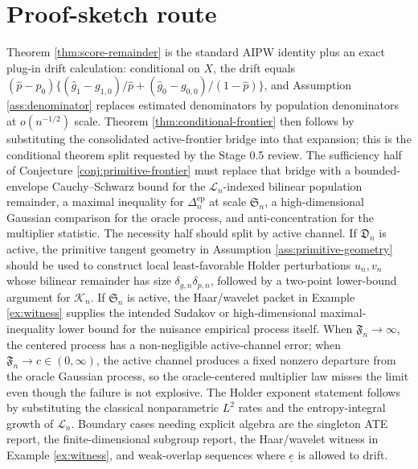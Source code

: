 \documentclass[11pt]{article}
\theoremstyle{definition}
\theoremstyle{plain}
\theoremstyle{remark}
\begin{document}
\section{Proof-sketch route}
Theorem \ref{thm:score-remainder} is the standard AIPW identity plus an exact
plug-in drift calculation: conditional on \(X\), the drift equals
\((\hat p-p_0)\{(\hat g_1-g_{1,0})/\hat p+(\hat g_0-g_{0,0})/(1-\hat p)\}\),
and Assumption \ref{ass:denominator} replaces estimated denominators by
population denominators at \(o(n^{-1/2})\) scale.  Theorem
\ref{thm:conditional-frontier} then follows by substituting the consolidated
active-frontier bridge into that expansion; this is the conditional theorem
split requested by the Stage 0.5 review.  The sufficiency half of Conjecture
\ref{conj:primitive-frontier} must replace that bridge with a
bounded-envelope Cauchy--Schwarz bound for the \(\mathcal{L}_n\)-indexed
bilinear population remainder, a maximal inequality for
\(\Delta^{\mathrm{ep}}_n\) at scale \(\mathfrak{S}_n\), a high-dimensional
Gaussian comparison for the oracle process, and anti-concentration for the
multiplier statistic.  The necessity half should split by active channel.  If
\(\mathfrak{D}_n\) is active, the primitive tangent geometry in Assumption
\ref{ass:primitive-geometry} should be used to construct local least-favorable
Holder perturbations \(u_n,v_n\) whose bilinear remainder has size
\(\delta_{g,n}\delta_{p,n}\), followed by a two-point lower-bound argument for
\(\mathcal{K}_n\).  If \(\mathfrak{S}_n\) is active, the Haar/wavelet packet in
Example \ref{ex:witness} supplies the intended Sudakov or high-dimensional
maximal-inequality lower bound for the nuisance empirical process itself.  When
\(\mathfrak{F}_n\to\infty\), the centered process has a non-negligible
active-channel error; when \(\mathfrak{F}_n\to c\in(0,\infty)\), the active
channel produces a fixed nonzero departure from the oracle Gaussian process,
so the oracle-centered multiplier law misses the limit even though the failure
is not explosive.  The Holder exponent statement follows by
substituting the classical nonparametric \(L^2\) rates and the entropy-integral
growth of \(\mathcal{L}_n\).  Boundary cases needing explicit algebra are the
singleton ATE report, the finite-dimensional subgroup report, the Haar/wavelet
witness in Example \ref{ex:witness}, and weak-overlap sequences where
\(\underline e\) is allowed to drift.
\end{document}
